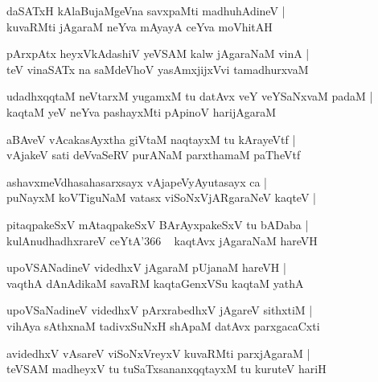 \documentclass[twoside,12pt,openright]{book}
\newcounter{shloka}[chapter]
\begin{document}
\begin{shloka}%
daSATxH kAlaBujaMgeVna savxpaMti madhuhAdineV |\\
kuvaRMti jAgaraM neYva mAyayA ceYva moVhitAH 
\end{shloka}

\begin{shloka}%
pArxpAtx heyxVkAdashiV yeVSAM kalw jAgaraNaM vinA |\\
teV vinaSATx na saMdeVhoV yasAmxjijxVvi tamadhurxvaM 
\end{shloka}

\begin{shloka}%
udadhxqqtaM neVtarxM yugamxM tu datAvx veY veYSaNxvaM padaM |\\
kaqtaM yeV neYva pashayxMti pApinoV harijAgaraM 
\end{shloka}

\begin{shloka}%
aBAveV vAcakasAyxtha giVtaM naqtayxM tu kArayeVtf |\\
vAjakeV sati deVvaSeRV purANaM parxthamaM paTheVtf
\end{shloka}

\begin{shloka}%
ashavxmeVdhasahasarxsayx vAjapeVyAyutasayx ca |\\
puNayxM koVTiguNaM vatasx viSoNxVjARgaraNeV kaqteV |\\
\end{shloka}

\begin{shloka}%
pitaqpakeSxV mAtaqpakeSxV BArAyxpakeSxV tu bADaba |\\
kulAnudhadhxrareV ceYtA\char'366 ~ kaqtAvx jAgaraNaM hareVH 
\end{shloka}

\begin{shloka}%
upoVSANadineV videdhxV jAgaraM pUjanaM hareVH |\\
vaqthA dAnAdikaM savaRM kaqtaGenxVSu kaqtaM yathA 
\end{shloka}

\begin{shloka}%
upoVSaNadineV videdhxV pArxrabedhxV jAgareV sithxtiM |\\
vihAya sAthxnaM tadivxSuNxH shApaM datAvx parxgacaCxti
\end{shloka}

\begin{shloka}%
avidedhxV vAsareV viSoNxVreyxV kuvaRMti parxjAgaraM |\\
teVSAM madheyxV tu tuSaTxsananxqqtayxM tu kuruteV hariH 
\end{shloka}
\end{document}
